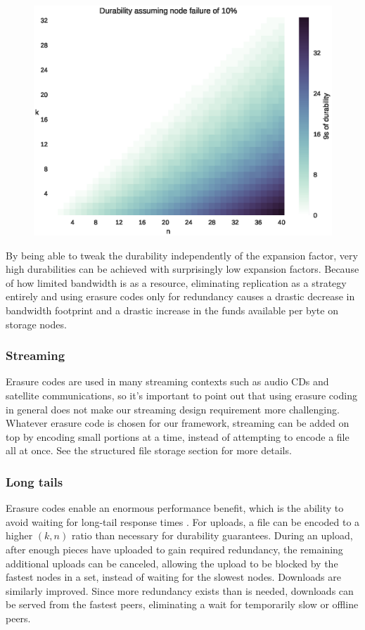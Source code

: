 \documentclass[a4paper,10pt]{article} \usepackage[utf8]{inputenc}
\begin{document}
\begin{figure} \centering
\includegraphics[width=\linewidth]{durability/durability.eps}
\end{figure}

By being able to tweak the durability independently of the expansion factor,
very high durabilities can be achieved with surprisingly low expansion factors.
Because of how limited bandwidth is as a resource, eliminating replication as a
strategy entirely and using erasure codes only for redundancy causes a drastic
decrease in bandwidth footprint and a drastic increase in the funds available
per byte on storage nodes.

\subsubsection{Streaming}

Erasure codes are used in many streaming contexts such as audio CDs and
satellite communications, so it's important to point out that using erasure
coding in general does not make our streaming design requirement more
challenging. Whatever erasure code is chosen for our framework, streaming can be
added on top by encoding small portions at a time, instead of attempting to
encode a file all at once. See the structured file storage section for more
details.

\subsubsection{Long tails}

Erasure codes enable an enormous performance benefit, which is the ability to
avoid waiting for long-tail response times \cite{tail-at-scale}. For uploads, a
file can be encoded to a higher $(k, n)$ ratio than necessary for durability
guarantees. During an upload, after enough pieces have uploaded to gain required
redundancy, the remaining additional uploads can be canceled, allowing the
upload to be blocked by the fastest nodes in a set, instead of waiting for the
slowest nodes. Downloads are similarly improved. Since more redundancy exists
than is needed, downloads can be served from the fastest peers, eliminating a
wait for temporarily slow or offline peers.
\end{document}
